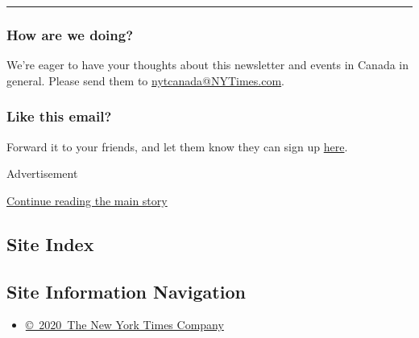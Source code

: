 \begin{center}\rule{0.5\linewidth}{\linethickness}\end{center}

\hypertarget{how-are-we-doing}{%
\subsubsection{\texorpdfstring{\textbf{How are we
doing?}}{How are we doing?}}\label{how-are-we-doing}}

We're eager to have your thoughts about this newsletter and events in
Canada in general. Please send them to
\href{mailto:nytcanada@NYTimes.com?\%20subject=Canada\%20Letter\%20Newsletter\%20Feedback}{nytcanada@NYTimes.com}.

\hypertarget{like-this-email}{%
\subsubsection{\texorpdfstring{\textbf{Like this
email?}}{Like this email?}}\label{like-this-email}}

Forward it to your friends, and let them know they can sign up
\href{https://www.nytimes3xbfgragh.onion/newsletters/canada-letter?smid=nytemail\&smvar=canadaletter\&te=1\&nl=canada-today\&emc=edit_cnda_20190622}{here}.

Advertisement

\protect\hyperlink{after-bottom}{Continue reading the main story}

\hypertarget{site-index}{%
\subsection{Site Index}\label{site-index}}

\hypertarget{site-information-navigation}{%
\subsection{Site Information
Navigation}\label{site-information-navigation}}

\begin{itemize}
\tightlist
\item
  \href{https://help.nytimes3xbfgragh.onion/hc/en-us/articles/115014792127-Copyright-notice}{©~2020~The
  New York Times Company}
\end{itemize}

